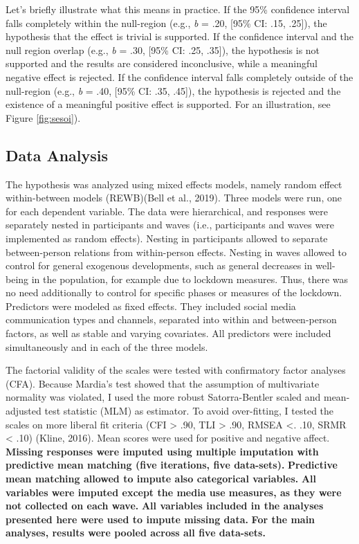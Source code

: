\documentclass[
  man,mask]{apa7}
\begin{document}
Let's briefly illustrate what this means in practice.
If the 95\% confidence interval falls completely within the null-region (e.g., \emph{b} = .20, {[}95\% CI: .15, .25{]}), the hypothesis that the effect is trivial is supported.
If the confidence interval and the null region overlap (e.g., \emph{b} = .30, {[}95\% CI: .25, .35{]}), the hypothesis is not supported and the results are considered inconclusive, while a meaningful negative effect is rejected.
If the confidence interval falls completely outside of the null-region (e.g., \emph{b} = .40, {[}95\% CI: .35, .45{]}), the hypothesis is rejected and the existence of a meaningful positive effect is supported.
For an illustration, see Figure \ref{fig:sesoi}).

\hypertarget{data-analysis}{%
\subsection{Data Analysis}\label{data-analysis}}

The hypothesis was analyzed using mixed effects models, namely random effect within-between models (REWB)(Bell et al., 2019).
Three models were run, one for each dependent variable.
The data were hierarchical, and responses were separately nested in participants and waves (i.e., participants and waves were implemented as random effects).
Nesting in participants allowed to separate between-person relations from within-person effects.
Nesting in waves allowed to control for general exogenous developments, such as general decreases in well-being in the population, for example due to lockdown measures.
Thus, there was no need additionally to control for specific phases or measures of the lockdown.
Predictors were modeled as fixed effects.
They included social media communication types and channels, separated into within and between-person factors, as well as stable and varying covariates.
All predictors were included simultaneously and in each of the three models.

The factorial validity of the scales were tested with confirmatory factor analyses (CFA).
Because Mardia's test showed that the assumption of multivariate normality was violated, I used the more robust Satorra-Bentler scaled and mean-adjusted test statistic (MLM) as estimator.
To avoid over-fitting, I tested the scales on more liberal fit criteria (CFI \textgreater{} .90, TLI \textgreater{} .90, RMSEA \textless. .10, SRMR \textless{} .10) (Kline, 2016).
Mean scores were used for positive and negative affect.
\textbf{Missing responses were imputed using multiple imputation with predictive mean matching (five iterations, five data-sets).}
\textbf{Predictive mean matching allowed to impute also categorical variables.}
\textbf{All variables were imputed except the media use measures, as they were not collected on each wave.}
\textbf{All variables included in the analyses presented here were used to impute missing data.}
\textbf{For the main analyses, results were pooled across all five data-sets.}
\end{document}
